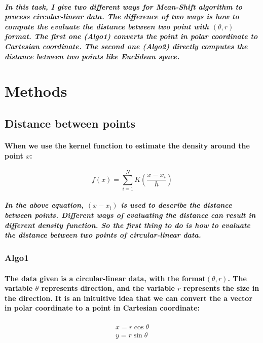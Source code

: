 \documentclass{article}
\begin{document}
\subparagraph{
In this task, I give two different ways for Mean-Shift algorithm to process circular-linear data. The difference of two ways is how to compute the evaluate the distance between two point with $(\theta, r)$ format. The first one (Algo1) converts the point in polar coordinate to Cartesian coordinate. The second one (Algo2) directly computes the distance between two points like Euclidean space.
}

\section{Methods}

\subsection{Distance between points}
\paragraph{
When we use the kernel function to estimate the density around the point $x$:
}
\begin{equation}
f(x) = \sum_{i=1}^{N}K(\frac{x-x_i}{h})
\end{equation}
\subparagraph{
In the above equation, $(x-x_i)$ is used to describe the \textit{distance} between points. Different ways of evaluating the distance can result in different density function. So the first thing to do is how to evaluate the distance between two points of circular-linear data.
}

\subsubsection{Algo1}
\paragraph{
The data given is a circular-linear data, with the format$(\theta, r)$. The variable $\theta$ represents direction, and the variable $r$ represents the size in the direction. It is an inituitive idea that we can convert the a vector in polar coordinate to a point in Cartesian coordinate:
}

\begin{equation}
\begin{aligned}
x = r \cos{\theta} \\
y = r \sin {\theta}
\end{aligned}
\end{equation}
\end{document}
